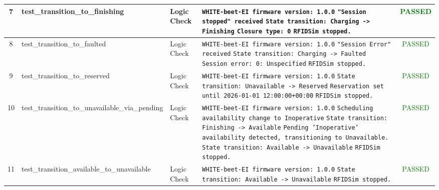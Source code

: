 \documentclass[10pt, a4paper, landscape]{article}
\begin{document}
\begin{longtable}{|c|p{6cm}|p{2.5cm}|p{8cm}|c|}
\hline
7 & test\_transition\_to\_finishing & Logic Check & \texttt{\scriptsize WHITE-beet-EI firmware version: 1.0.0} \newline \texttt{\scriptsize "Session stopped" received} \newline \texttt{\scriptsize State transition: Charging -> Finishing} \newline \texttt{\scriptsize Closure type: 0} \newline \texttt{\scriptsize RFIDSim stopped.} & \textcolor{green}{PASSED} \\
\hline
8 & test\_transition\_to\_faulted & Logic Check & \texttt{\scriptsize WHITE-beet-EI firmware version: 1.0.0} \newline \texttt{\scriptsize "Session Error" received} \newline \texttt{\scriptsize State transition: Charging -> Faulted} \newline \texttt{\scriptsize Session error: 0: Unspecified} \newline \texttt{\scriptsize RFIDSim stopped.} & \textcolor{green}{PASSED} \\
\hline
9 & test\_transition\_to\_reserved & Logic Check & \texttt{\scriptsize WHITE-beet-EI firmware version: 1.0.0} \newline \texttt{\scriptsize State transition: Unavailable -> Reserved} \newline \texttt{\scriptsize Reservation set until 2026-01-01 12:00:00+00:00} \newline \texttt{\scriptsize RFIDSim stopped.} & \textcolor{green}{PASSED} \\
\hline
10 & test\_transition\_to\_unavailable\_via\_pending & Logic Check & \texttt{\scriptsize WHITE-beet-EI firmware version: 1.0.0} \newline \texttt{\scriptsize Scheduling availability change to Inoperative} \newline \texttt{\scriptsize State transition: Finishing -> Available} \newline \texttt{\scriptsize Pending 'Inoperative' availability detected, transitioning to Unavailable.} \newline \texttt{\scriptsize State transition: Available -> Unavailable} \newline \texttt{\scriptsize RFIDSim stopped.} & \textcolor{green}{PASSED} \\
\hline
11 & test\_transition\_available\_to\_unavailable & Logic Check & \texttt{\scriptsize WHITE-beet-EI firmware version: 1.0.0} \newline \texttt{\scriptsize State transition: Available -> Unavailable} \newline \texttt{\scriptsize RFIDSim stopped.} & \textcolor{green}{PASSED} \\

\end{longtable}
\end{document}
